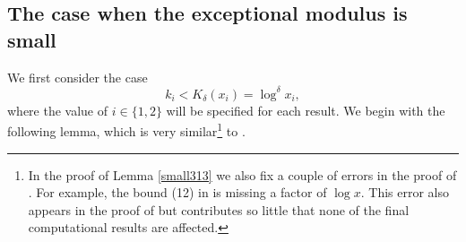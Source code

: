 \documentclass[12pt]{amsart}
\begin{document}
\subsection{The case when the exceptional modulus is small}\label{sectsmall}

We first consider the case  
\begin{equation}
    \label{eq:smallmodulus}
    k_i<K_{\delta}(x_i)=\log^{\delta}x_i,
\end{equation}
where the value of $i\in\{1,2\}$ will be specified for each result. We begin with the following lemma, which is very similar\footnote{In the proof of Lemma \ref{small313} we also fix a couple of errors in the proof of \cite[Theorem 1.4]{Bordignon4}. For example, the bound (12) in \cite{Bordignon4} is missing a factor of $\log x$. This error also appears in the proof of \cite[Theorem 1.2]{Bordignon4} but contributes so little that none of the final computational results are affected.} to \cite[Theorem 1.4]{Bordignon4}.
\end{document}
